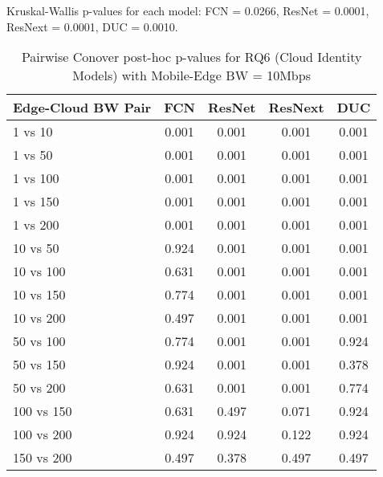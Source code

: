 \begin{table}[h]
\centering
\caption{Pairwise Conover post-hoc p-values for RQ6 (Cloud Identity Models) with Mobile-Edge BW = 10Mbps}
\label{tab:conover_cloud_identity_me10}
\smallskip
Kruskal-Wallis p-values for each model: FCN = 0.0266, ResNet = 0.0001, ResNext = 0.0001, DUC = 0.0010.

\begin{tabular}{lcccc}
\toprule
Edge-Cloud BW Pair & FCN & ResNet & ResNext & DUC \\
\midrule
1 vs 10 & 0.001 & 0.001 & 0.001 & 0.001 \\
1 vs 50 & 0.001 & 0.001 & 0.001 & 0.001 \\
1 vs 100 & 0.001 & 0.001 & 0.001 & 0.001 \\
1 vs 150 & 0.001 & 0.001 & 0.001 & 0.001 \\
1 vs 200 & 0.001 & 0.001 & 0.001 & 0.001 \\
10 vs 50 & 0.924 & 0.001 & 0.001 & 0.001 \\
10 vs 100 & 0.631 & 0.001 & 0.001 & 0.001 \\
10 vs 150 & 0.774 & 0.001 & 0.001 & 0.001 \\
10 vs 200 & 0.497 & 0.001 & 0.001 & 0.001 \\
50 vs 100 & 0.774 & 0.001 & 0.001 & 0.924 \\
50 vs 150 & 0.924 & 0.001 & 0.001 & 0.378 \\
50 vs 200 & 0.631 & 0.001 & 0.001 & 0.774 \\
100 vs 150 & 0.631 & 0.497 & 0.071 & 0.924 \\
100 vs 200 & 0.924 & 0.924 & 0.122 & 0.924 \\
150 vs 200 & 0.497 & 0.378 & 0.497 & 0.497 \\
\bottomrule
\end{tabular}
\end{table}

